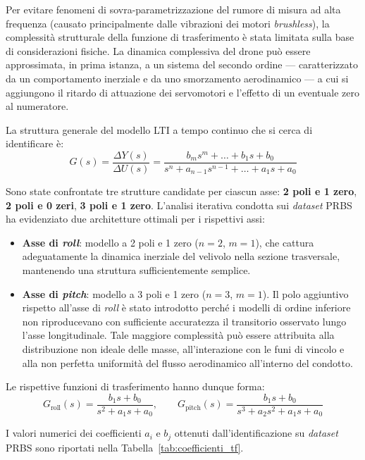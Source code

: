\documentclass[11pt]{report}
\begin{document}
Per evitare fenomeni di sovra-parametrizzazione del rumore di misura ad alta frequenza (causato principalmente dalle vibrazioni dei motori \textit{brushless}), la complessità strutturale della funzione di trasferimento è stata limitata sulla base di considerazioni fisiche. La dinamica complessiva del drone può essere approssimata, in prima istanza, a un sistema del secondo ordine --- caratterizzato da un comportamento inerziale e da uno smorzamento aerodinamico --- a cui si aggiungono il ritardo di attuazione dei servomotori e l'effetto di un eventuale zero al numeratore.

La struttura generale del modello LTI a tempo continuo che si cerca di identificare è:
\begin{equation}
	G(s) = \frac{\Delta Y(s)}{\Delta U(s)} = 
	\frac{b_m s^m + \dots + b_1 s + b_0}
	{s^n + a_{n-1} s^{n-1} + \dots + a_1 s + a_0}
	\label{eq:tf_generale}
\end{equation}

Sono state confrontate tre strutture candidate per ciascun asse: \textbf{2 poli e 1 zero}, \textbf{2 poli e 0 zeri}, \textbf{3 poli e 1 zero}. L'analisi iterativa condotta sui \textit{dataset} PRBS ha evidenziato due architetture ottimali per i rispettivi assi:
\begin{itemize}
	\item \textbf{Asse di \textit{roll}}: modello a 2 poli e 1 zero ($n=2$, $m=1$), che cattura adeguatamente la dinamica inerziale del velivolo nella sezione trasversale, mantenendo una struttura sufficientemente semplice.
	\item \textbf{Asse di \textit{pitch}}: modello a 3 poli e 1 zero ($n=3$, $m=1$). Il polo aggiuntivo rispetto all'asse di \textit{roll} è stato introdotto perché i modelli di ordine inferiore non riproducevano con sufficiente accuratezza il transitorio osservato lungo l'asse longitudinale. Tale maggiore complessità può essere attribuita alla distribuzione non ideale delle masse, all'interazione con le funi di vincolo e alla non perfetta uniformità del flusso aerodinamico all'interno del condotto.
\end{itemize}

Le rispettive funzioni di trasferimento hanno dunque forma:
\begin{equation}
	G_\text{roll}(s) = \frac{b_1 s + b_0}{s^2 + a_1 s + a_0},
	\qquad
	G_\text{pitch}(s) = \frac{b_1 s + b_0}{s^3 + a_2 s^2 + a_1 s + a_0}
	\label{eq:tf_assi}
\end{equation}

I valori numerici dei coefficienti $a_i$ e $b_j$ ottenuti dall'identificazione su \textit{dataset} PRBS sono riportati nella Tabella~\ref{tab:coefficienti_tf}.
\end{document}
